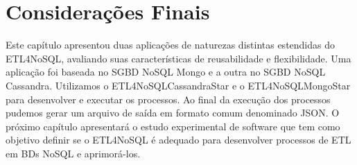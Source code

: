 \section{Considerações Finais}

Este capítulo apresentou duas aplicações de naturezas distintas estendidas do ETL4NoSQL, avaliando suas características de reusabilidade e flexibilidade. Uma aplicação foi baseada no SGBD NoSQL Mongo e a outra no SGBD NoSQL Cassandra. Utilizamos o ETL4NoSQLCassandraStar e o ETL4NoSQLMongoStar para desenvolver e executar os processos. Ao final da execução dos processos pudemos gerar um arquivo de saída em formato comum denominado JSON. O próximo capítulo apresentará o estudo experimental de software que tem como objetivo definir se o ETL4NoSQL é adequado para desenvolver processos de ETL em BDs NoSQL e aprimorá-los.
